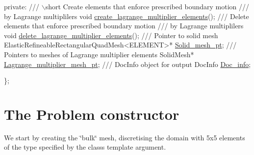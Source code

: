 \begin{DoxyCodeInclude}
\textcolor{keyword}{private}:
\textcolor{comment}{}
\textcolor{comment}{ /// \(\backslash\)short Create elements that enforce prescribed boundary motion}
\textcolor{comment}{ /// by Lagrange multiplilers}
\textcolor{comment}{} \textcolor{keywordtype}{void} \hyperlink{classPrescribedBoundaryDisplacementProblem_adf4798f13809f5b2f2be6e3d63421edc}{create\_lagrange\_multiplier\_elements}();
\textcolor{comment}{}
\textcolor{comment}{ /// Delete elements that enforce prescribed boundary motion}
\textcolor{comment}{ /// by Lagrange multiplilers}
\textcolor{comment}{} \textcolor{keywordtype}{void} \hyperlink{classPrescribedBoundaryDisplacementProblem_a0204ae947ffd18ed3d7690395901a1e8}{delete\_lagrange\_multiplier\_elements}();
\textcolor{comment}{}
\textcolor{comment}{ /// Pointer to solid mesh}
\textcolor{comment}{} ElasticRefineableRectangularQuadMesh<ELEMENT>* \hyperlink{classPrescribedBoundaryDisplacementProblem_a6d2cdbd9ae1077c80831d938bdb72a61}{Solid\_mesh\_pt};
\textcolor{comment}{}
\textcolor{comment}{ /// Pointers to meshes of Lagrange multiplier elements}
\textcolor{comment}{} SolidMesh* \hyperlink{classPrescribedBoundaryDisplacementProblem_abb87cb0933297f449af7ceac7fe2bd77}{Lagrange\_multiplier\_mesh\_pt};
\textcolor{comment}{}
\textcolor{comment}{ /// DocInfo object for output}
\textcolor{comment}{} DocInfo \hyperlink{classPrescribedBoundaryDisplacementProblem_aef72ea29567df89d82fe93235f1907f8}{Doc\_info};
 
\};

\end{DoxyCodeInclude}




 

\hypertarget{index_constructor}{}\section{The Problem constructor}\label{index_constructor}
We start by creating the \char`\"{}bulk\char`\"{} mesh, discretising the domain with 5x5 elements of the type specified by the class\textquotesingle{}s template argument.

